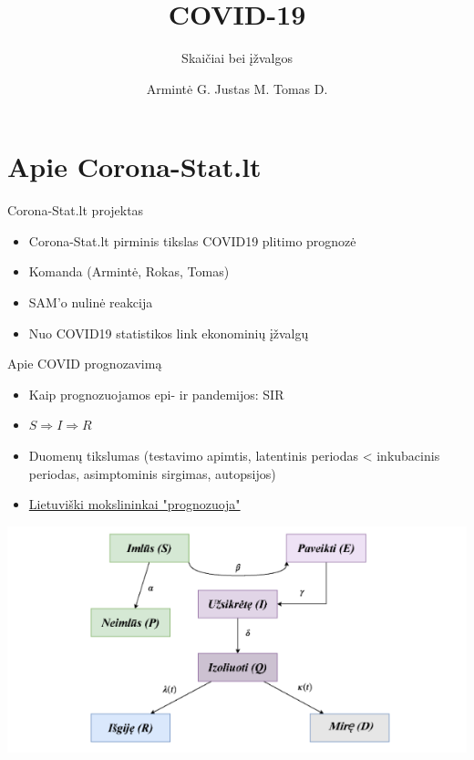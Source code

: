 \documentclass[aspectratio=169, 11pt]{beamer}
\author{Armintė G. Justas M. Tomas D.}
\title{COVID-19}
\subtitle{Skaičiai bei įžvalgos}
\begin{document}
\begin{frame}
\titlepage
\end{frame}

\begin{frame}
\tableofcontents
\end{frame}

\section{Apie Corona-Stat.lt}
\begin{frame}{Corona-Stat.lt projektas}
\begin{itemize}
\item Corona-Stat.lt pirminis tikslas COVID19 plitimo prognozė
\item Komanda (Armintė, Rokas, Tomas)
\item SAM'o nulinė reakcija
\item Nuo COVID19 statistikos link ekonominių įžvalgų
\end{itemize}
\end{frame}


\begin{frame}{Apie COVID prognozavimą}
\begin{itemize}
\item Kaip prognozuojamos epi- ir pandemijos: SIR
\item $S \Longrightarrow I \Longrightarrow R$
\item Duomenų tikslumas (testavimo apimtis, latentinis periodas < inkubacinis periodas, asimptominis sirgimas, autopsijos)
\item \href{https://mif.vu.lt/lt3/dokumentai/dokumentai/Naujienos/COVID/2020-04-15_SEIR_ilgalakes_prognozes.pdf}{Lietuviški mokslininkai "prognozuoja"}
\end{itemize}
\centering
\includegraphics[scale=0.4]{seiqrdp.png}

\end{frame}
\end{document}
